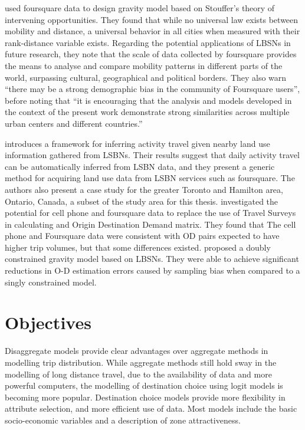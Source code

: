 \textcite{noulas2012tale} used foursquare data to design gravity model based on Stouffer's theory of intervening opportunities. They found that while no universal law exists between mobility and distance, a universal behavior in all cities when measured with their rank-distance variable exists. Regarding the potential applications of LBSNs in future research, they note that the scale of data collected by foursquare provides the means to analyse and compare mobility patterns in different parts of the world, surpassing cultural, geographical and political borders. They also warn \enquote{there may be a strong demographic bias in the community of Foursquare users}, before noting that \enquote{it is encouraging that the analysis and models developed in the context of the present work demonstrate strong similarities across multiple urban centers and different countries.}

\textcite{abdulazim2015framework} introduces a framework for inferring activity travel given nearby land use information gathered from LSBNs. Their results suggest that daily activity travel can be automatically inferred from LSBN data, and they present a generic method for acquiring land use data from LSBN services such as foursquare. The authors also present a case study for the  greater Toronto and Hamilton area, Ontario, Canada, a subset of the study area for this thesis.
\textcite{sa2015origin} investigated the potential for cell phone and foursquare data to replace the use of Travel Surveys in calculating and Origin Destination Demand matrix. They found that The cell phone and Foursquare data were consistent with OD pairs expected to have higher trip volumes, but that some differences existed.
\textcite{jin2014location} proposed a doubly constrained gravity model based on LBSNs. They were able to achieve significant reductions in O-D estimation errors caused by sampling bias when compared to a singly constrained model.

\section{Objectives}
Disaggregate models provide clear advantages over aggregate methods in modelling trip distribution. While aggregate methods still hold sway in the modelling of long distance travel, due to the availability of data and more powerful computers, the modelling of destination choice using logit models is becoming more popular. Destination choice models provide more flexibility in attribute selection, and more efficient use of data. Most models include the basic socio-economic variables and a description of zone attractiveness. 

